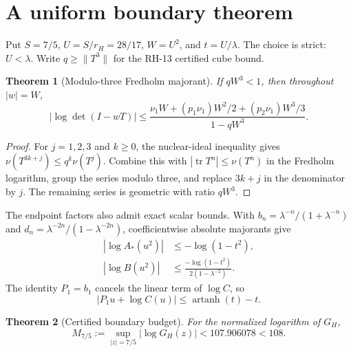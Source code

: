 \documentclass[11pt]{article}
\newtheorem{theorem}{Theorem}[section]
\theoremstyle{remark}
\begin{document}
\section{A uniform boundary theorem}

Put $S=7/5$, $U=S/r_H=28/17$, $W=U^2$, and $t=U/\lambda$.
The choice is strict: $U<\lambda$.  Write
$q\ge\|T^3\|$ for the RH-13 certified cube bound.

\begin{theorem}[Modulo-three Fredholm majorant]\label{thm:fredholm}
If $qW^3<1$, then throughout $|w|=W$,
\begin{equation}
 |\log\det(I-wT)|
 \le
 \frac{\nu_1W+(p_1\nu_1)W^2/2+(p_2\nu_1)W^3/3}
 {1-qW^3}.
 \label{eq:fredholm}
\end{equation}
\end{theorem}

\begin{proof}
For $j=1,2,3$ and $k\ge0$, the nuclear-ideal inequality gives
$\nu(T^{3k+j})\le q^k\nu(T^j)$.  Combine this with
$|\operatorname{tr}T^n|\le\nu(T^n)$ in the Fredholm logarithm, group the
series modulo three, and replace $3k+j$ in the denominator by $j$.
The remaining series is geometric with ratio $qW^3$.
\end{proof}

The endpoint factors also admit exact scalar bounds.  With
$b_n=\lambda^{-n}/(1+\lambda^{-n})$ and
$d_n=\lambda^{-2n}/(1-\lambda^{-2n})$, coefficientwise absolute majorants
give
\begin{align}
 |\log A_*(u^2)|&\le-\log(1-t^2),\label{eq:A}\\
 |\log B(u^2)|&\le
 \frac{-\log(1-t^2)}{2(1-\lambda^{-2})}.\label{eq:B}
\end{align}
The identity $P_1=b_1$ cancels the linear term of $\log C$, so
\begin{equation}
 |P_1u+\log C(u)|\le\operatorname{artanh}(t)-t.
 \label{eq:C}
\end{equation}

\begin{theorem}[Certified boundary budget]\label{thm:budget}
For the normalized logarithm of $G_H$,
\[
 \boxed{M_{7/5}:=\sup_{|z|=7/5}|\log G_H(z)|<107.906078<108.}
\]
\end{theorem}
\end{document}
